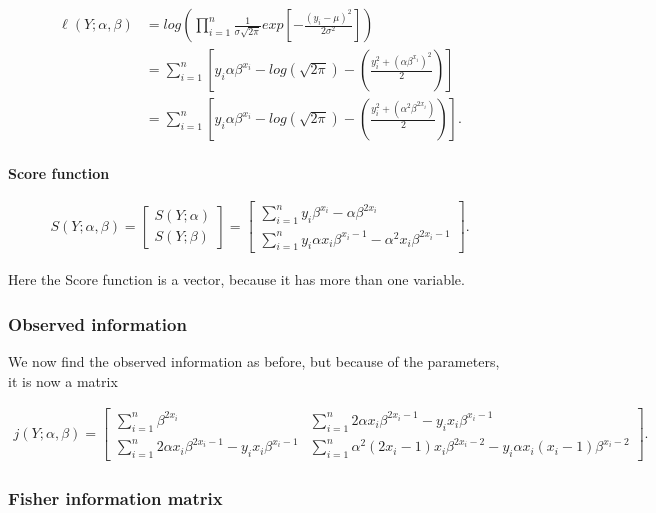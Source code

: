 \begin{align*}
   \ell(Y;\alpha, \beta) &= log \left( \prod_{i=1}^n \frac{1}{\sigma \sqrt{2 \pi}}exp\left[-\frac{(y_i -\mu)^2}{2 \sigma^2}\right] \right)\\
   &= \sum_{i = 1}^n \left[ y_i \alpha \beta^{x_i} - log\left( \sqrt{2 \pi}\right) - \left( \frac{y_i^2 + (\alpha \beta^{x_i})^2}{2} \right) \right]\\
   &=\sum_{i = 1}^n \left[ y_i \alpha \beta^{x_i} - log\left( \sqrt{2 \pi}\right) - \left( \frac{y_i^2 + (\alpha^2 \beta^{2x_i})}{2} \right) \right].\\
\end{align*}

\textbf{Score function}

\begin{align*}
    S\left( Y; \alpha, \beta \right) = \begin{bmatrix} S(Y;\alpha) \\ S(Y; \beta) \end{bmatrix} = \begin{bmatrix} \sum_{i=1}^n y_i \beta^{x_i} - \alpha\beta^{2x_i} \\ \sum_{i = 1}^n y_i\alpha x_i \beta^{x_i - 1} - \alpha^2 x_i \beta^{2x_i - 1} \end{bmatrix}.
\end{align*}

Here the Score function is a vector, because it has more than one variable. 

\subsubsection{Observed information}

We now find the observed information as before, but because of the parameters, it is now a matrix

\begin{align*}
    j\left( Y; \alpha ,\beta \right) = \begin{bmatrix} 
    \sum_{i = 1}^n \beta^{2x_i} 
    &
    \sum_{i = 1}^n 2\alpha x_i \beta^{2x_i - 1} - y_ix_i\beta^{x_i - 1}
    \\
    \sum_{i = 1}^n 2\alpha x_i \beta^{2x_i - 1} - y_ix_i\beta^{x_i - 1} 
    &
    \sum_{i = 1}^n \alpha^2(2x_i - 1)x_i\beta^{2x_i - 2} - y_i \alpha x_i(x_i - 1) \beta^{x_i - 2}
    \end{bmatrix}.
\end{align*}

\subsubsection{Fisher information matrix}

